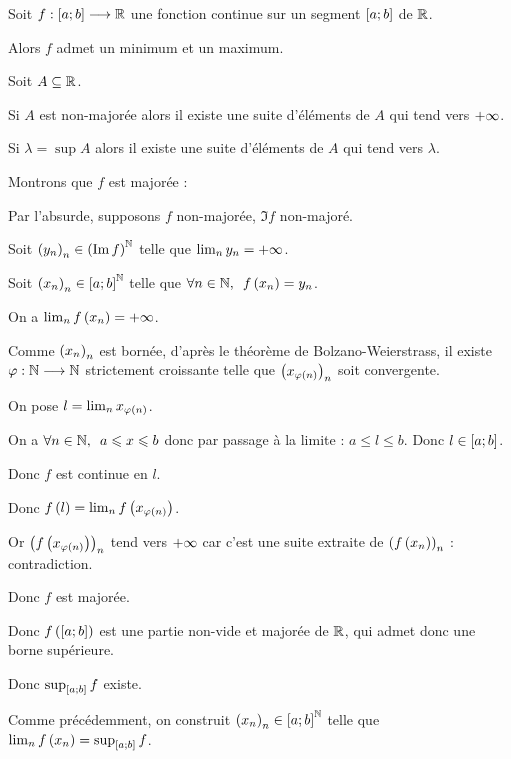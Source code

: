 \begin{theo}
Soit \(f:\left[a;b\right]\longrightarrow\mathbb{R}\) une fonction continue sur un segment \(\left[a;b\right]\) de \(\mathbb{R}\).

Alors \(f\) admet un minimum et un maximum.
\end{theo}

\begin{rappel}
Soit \(A\subseteq\mathbb{R}\).

Si \(A\) est non-majorée alors il existe une suite d'éléments de \(A\) qui tend vers \(+\infty\).

Si \(\lambda=\sup A\) alors il existe une suite d'éléments de \(A\) qui tend vers \(\lambda\).
\end{rappel}

\begin{dem}
Montrons que \(f\) est majorée :

Par l'absurde, supposons \(f\) non-majorée, \cad \(\Im f\) non-majoré.

Soit \(\left(y_n\right)_n\in\left(\operatorname{Im} f\right)^{\mathbb{N}}\) telle que \(\lim_ny_n=+\infty\).

Soit \(\left(x_n\right)_n\in\left[a;b\right]^{\mathbb{N}}\) telle que \(\quantifs{\forall n\in\N}f\paren{x_n}=y_n\).

On a \(\lim_nf\left(x_n\right)=+\infty\).

Comme \(\left(x_n\right)_n\) est bornée, d'après le théorème de Bolzano-Weierstrass, il existe \(\varphi:\mathbb{N}\longrightarrow\mathbb{N}\) strictement croissante telle que \(\left(x_{\varphi\left(n\right)}\right)_n\) soit convergente.

On pose \(l=\lim_nx_{\varphi\left(n\right)}\).

On a \(\quantifs{\forall n\in\N}a\leq x\leq b\) donc par passage à la limite : \(a\leq l\leq b\). Donc \(l\in\left[a;b\right]\).

Donc \(f\) est continue en \(l\).

Donc \(f\left(l\right)=\lim_nf\left(x_{\varphi\left(n\right)}\right)\).

Or \(\left(f\left(x_{\varphi\left(n\right)}\right)\right)_n\) tend vers \(+\infty\) car c'est une suite extraite de \(\left(f\left(x_n\right)\right)_n\) : contradiction.

Donc \(f\) est majorée.

Donc \(f\left(\left[a;b\right]\right)\) est une partie non-vide et majorée de \(\mathbb{R}\), qui admet donc une borne supérieure.

Donc \(\sup_{\left[a;b\right]}f\) existe.

Comme précédemment, on construit \(\left(x_n\right)_n\in\left[a;b\right]^{\mathbb{N}}\) telle que \(\lim_nf\left(x_n\right)=\sup_{\left[a;b\right]}f\).


\end{dem}
